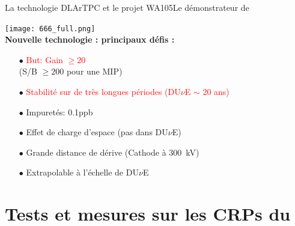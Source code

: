     \begin{frame}{La technologie DLArTPC et le projet WA105}{Le démonstrateur de \SSS{}}
    	\begin{scriptsize}
                \centering
    			\texttt{[image: 666\_full.png]}\\
    			\vfill
    			\textbf{Nouvelle technologie : principaux défis :}\\
    			\begin{minipage}{0.32\textwidth}
    				\begin{itemize}
    					\item[$\bullet$] \textcolor{red}{But: Gain $\geq 20$} \\(S/B $\geq 200$ pour une MIP)
    					\item[$\bullet$] \textcolor{red}{Stabilité sur de très longues périodes (DU$\nu$E $\sim$ 20 ans)}
    				\end{itemize}
    			\end{minipage}\hfill
    			\begin{minipage}{0.32\textwidth}
    				\begin{itemize}
    					\item[$\bullet$] Impuretés: 0.1\;ppb
    					\item[$\bullet$] Effet de charge d'espace
    					(pas dans DU$\nu$E)
    				\end{itemize}
	    		\end{minipage}\hfill
	    		\begin{minipage}{0.32\textwidth}
	    			\begin{itemize}
	    				\item[$\bullet$] Grande distance de dérive (Cathode à \SI{300}{\kilo\volt})
	    				\item[$\bullet$] Extrapolable à l'échelle de DU$\nu$E
	    			\end{itemize}
	    		\end{minipage}
    	\end{scriptsize} 
    \end{frame}


    \section[Tests et mesures]{Tests et mesures sur les CRPs du \SSS{}}

